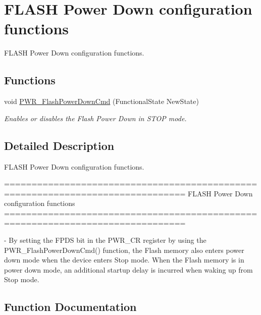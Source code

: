 \hypertarget{group___p_w_r___group5}{}\section{F\+L\+A\+S\+H Power Down configuration functions}
\label{group___p_w_r___group5}


F\+L\+A\+S\+H Power Down configuration functions.  


\subsection*{Functions}
\begin{DoxyCompactItemize}
\item 
void \hyperlink{group___p_w_r___group5_gaf0af19a9fdf0324f2ada60c9bce1aab5}{P\+W\+R\+\_\+\+Flash\+Power\+Down\+Cmd} (Functional\+State New\+State)
\begin{DoxyCompactList}\small\item\em Enables or disables the Flash Power Down in S\+T\+O\+P mode. \end{DoxyCompactList}\end{DoxyCompactItemize}


\subsection{Detailed Description}
F\+L\+A\+S\+H Power Down configuration functions. 

\begin{DoxyVerb} ===============================================================================
           FLASH Power Down configuration functions
 ===============================================================================  

 - By setting the FPDS bit in the PWR_CR register by using the PWR_FlashPowerDownCmd()
   function, the Flash memory also enters power down mode when the device enters 
   Stop mode. When the Flash memory is in power down mode, an additional startup 
   delay is incurred when waking up from Stop mode.\end{DoxyVerb}
 

\subsection{Function Documentation}
\hypertarget{group___p_w_r___group5_gaf0af19a9fdf0324f2ada60c9bce1aab5}{}
